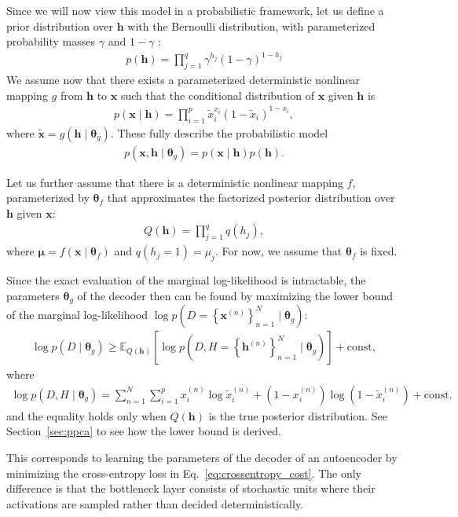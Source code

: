 \documentclass{now}
\newcommand{\vect}[1]{\mathbf{#1}}
\newcommand{\vects}[1]{\boldsymbol{#1}}
\newcommand{\vh}[0]{\vect{h}}
\newcommand{\vx}[0]{\vect{x}}
\newcommand{\vmu}[0]{\vects{\mu}}
\newcommand{\TT}[0]{{\vects{\theta}}}
\newcommand{\E}[0]{\mathbb{E}}
\begin{document}
Since we will now view this model in a probabilistic
framework, let us define a prior distribution over $\vh$
with the
Bernoulli distribution, with parameterized probability masses
$\gamma$ and $1-\gamma$ :
\begin{align}
    \label{eq:ae_prior}
    p(\vh) = \prod_{j=1}^q \gamma^{h_j} (1 - \gamma)^{1 -
    h_j}
\end{align}
We assume now that there exists a parameterized
deterministic nonlinear mapping $g$ from $\vh$ to $\vx$ such
that the conditional distribution of $\vx$ given $\vh$ is
\begin{align}
    \label{eq:ae_cond}
    p(\vx \mid \vh) = \prod_{i=1}^p \tilde{x}_i^{x_i} (1 -
    \tilde{x}_i)^{1 - x_i},
\end{align}
where $\tilde{\vx} = g(\vh \mid \TT_g)$. These fully
describe the probabilistic model 
\begin{align}
    \label{eq:ae_full}
p(\vx, \vh \mid \TT_g) = p(\vx \mid \vh) p(\vh).
\end{align}

Let us further assume that there is a deterministic
nonlinear mapping $f$, parameterized by $\TT_f$ that
approximates the factorized posterior distribution over
$\vh$ given $\vx$:
\begin{align}
    \label{eq:ae_posterior}
    Q(\vh) = \prod_{j=1}^q q(h_j),
\end{align}
where $\vmu = f(\vx \mid \TT_f)$ and $q(h_j = 1) = \mu_j$.
For now, we assume that $\TT_f$ is fixed.

Since the exact evaluation of the marginal log-likelihood is
intractable, the parameters $\TT_g$ of the decoder then
can be found by maximizing the lower bound of the marginal
log-likelihood $\log p(D = \left\{ \vx^{(n)}
\right\}_{n=1}^N \mid \TT_g)$:
\begin{align*}
    \log p(D \mid \TT_g) \geq \E_{Q(\vh)} \left[ \log p\left(D,
    H=\left\{ \vh^{(n)} \right\}_{n=1}^N \mid \TT_g\right) \right] +
    \text{const},
\end{align*}
where 
\begin{align*}
    \log p(D, H \mid \TT_g) = \sum_{n=1}^N \sum_{i=1}^p
    x^{(n)}_i \log
    \tilde{x}^{(n)}_i + (1 - x^{(n)}_i) \log (1 -
    \tilde{x}^{(n)}_i) + \text{const}.
\end{align*}
and the equality holds only when $Q(\vh)$ is the true
posterior distribution. See Section~\ref{sec:ppca} to see
how the lower bound is derived.

This corresponds to learning the
parameters of the decoder of an autoencoder by minimizing
the cross-entropy loss in Eq.~\eqref{eq:crossentropy_cost}.
The only difference is that the bottleneck layer consists of
stochastic units where their activations are sampled
rather than decided deterministically. 
\end{document}
